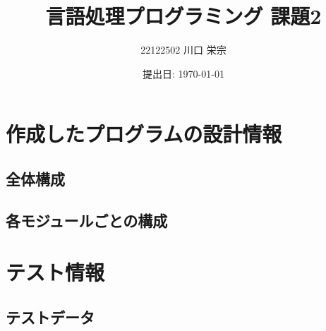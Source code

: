 \documentclass{jlreq}
\title{言語処理プログラミング 課題2}
\author{22122502 川口 栄宗}
\date{提出日: \today}
\begin{document}
\maketitle
\clearpage

\section{作成したプログラムの設計情報}

\subsection{全体構成}

\subsection{各モジュールごとの構成}

\section{テスト情報}

\subsection{テストデータ}
\end{document}
